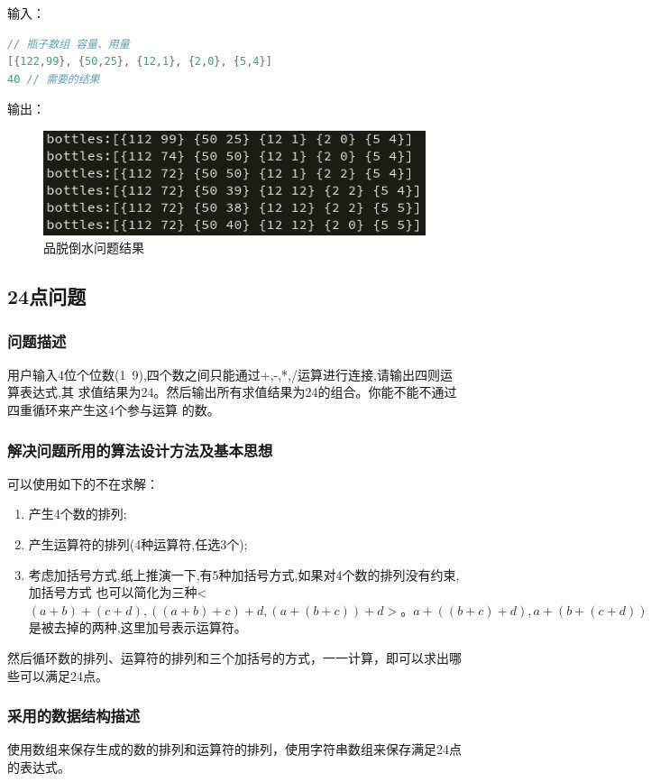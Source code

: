 \documentclass{ctexart}
\begin{document}
输入：
\begin{lstlisting}[language=C]
// 瓶子数组 容量、用量
[{122,99}, {50,25}, {12,1}, {2,0}, {5,4}] 
40 // 需要的结果
\end{lstlisting}

输出：
\begin{figure}[H]
	\centering
	\includegraphics[scale=0.6]{../images/eight_pints_result_demo.png}
	\caption{品脱倒水问题结果}
\end{figure}

\newpage
\subsection{24点问题}
\subsubsection{问题描述}
用户输入4位个位数(1~9),四个数之间只能通过+,-,*,/运算进行连接,请输出四则运算表达式,其
求值结果为24。然后输出所有求值结果为24的组合。你能不能不通过四重循环来产生这4个参与运算
的数。
\subsubsection{解决问题所用的算法设计方法及基本思想}
可以使用如下的不在求解：
\begin{enumerate}
	\item 产生4个数的排列;
	\item 产生运算符的排列(4种运算符,任选3个);
	\item 考虑加括号方式,纸上推演一下,有5种加括号方式,如果对4个数的排列没有约束,加括号方式
也可以简化为三种< $(a+b)+(c+d), ((a+b)+c)+d, (a+(b+c))+d>。a+((b+c)+d),a+(b+(c+d))$ 是被去掉的两种,这里加号表示运算符。
\end{enumerate}

然后循环数的排列、运算符的排列和三个加括号的方式，一一计算，即可以求出哪些可以满足24点。
\subsubsection{采用的数据结构描述}
使用数组来保存生成的数的排列和运算符的排列，使用字符串数组来保存满足24点的表达式。
\end{document}
